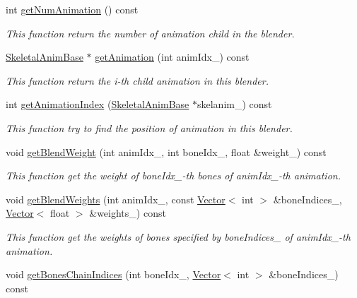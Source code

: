 \begin{DoxyCompactItemize}
int \hyperlink{class_magnum_1_1_skeletal_anim_blender_ac261e7a6c3470dfa41908820ce8614db}{get\+Num\+Animation} () const 
\begin{DoxyCompactList}\small\item\em This function return the number of animation child in the blender. \end{DoxyCompactList}\item 
\hyperlink{class_magnum_1_1_skeletal_anim_base}{Skeletal\+Anim\+Base} $\ast$ \hyperlink{class_magnum_1_1_skeletal_anim_blender_a2137c37213897098baa81e124a522792}{get\+Animation} (int anim\+Idx\+\_\+) const 
\begin{DoxyCompactList}\small\item\em This function return the i-\/th child animation in this blender. \end{DoxyCompactList}\item 
int \hyperlink{class_magnum_1_1_skeletal_anim_blender_afdffb9f35a47376519e1f76320617a65}{get\+Animation\+Index} (\hyperlink{class_magnum_1_1_skeletal_anim_base}{Skeletal\+Anim\+Base} $\ast$skelanim\+\_\+) const 
\begin{DoxyCompactList}\small\item\em This function try to find the position of animation in this blender. \end{DoxyCompactList}\item 
void \hyperlink{class_magnum_1_1_skeletal_anim_blender_a8e1ebfea65b0b2a905db941a06c08ad6}{get\+Blend\+Weight} (int anim\+Idx\+\_\+, int bone\+Idx\+\_\+, float \&weight\+\_\+) const 
\begin{DoxyCompactList}\small\item\em This function get the weight of bone\+Idx\+\_\+-\/th bones of anim\+Idx\+\_\+-\/th animation. \end{DoxyCompactList}\item 
void \hyperlink{class_magnum_1_1_skeletal_anim_blender_a261d22fd30ce53a3b4eba0c74cb8d36e}{get\+Blend\+Weights} (int anim\+Idx\+\_\+, const \hyperlink{class_magnum_1_1_vector}{Vector}$<$ int $>$ \&bone\+Indices\+\_\+, \hyperlink{class_magnum_1_1_vector}{Vector}$<$ float $>$ \&weights\+\_\+) const 
\begin{DoxyCompactList}\small\item\em This function get the weights of bones specified by bone\+Indices\+\_\+ of anim\+Idx\+\_\+-\/th animation. \end{DoxyCompactList}\item 
void \hyperlink{class_magnum_1_1_skeletal_anim_blender_ac27ac3f678bf095440b95ab914dd5ce0}{get\+Bones\+Chain\+Indices} (int bone\+Idx\+\_\+, \hyperlink{class_magnum_1_1_vector}{Vector}$<$ int $>$ \&bone\+Indices\+\_\+) const 

\end{DoxyCompactItemize}
